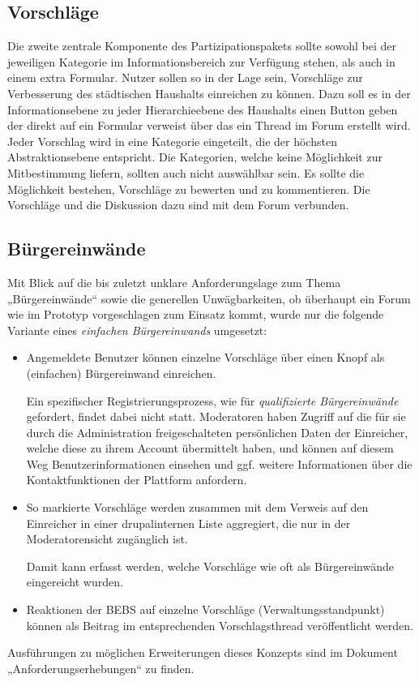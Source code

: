 \documentclass[a4paper,11pt,twoside]{article}
\begin{document}
\subsection{Vorschläge}
Die zweite zentrale Komponente des Partizipationspakets sollte sowohl bei der
jeweiligen Kategorie im Informationsbereich zur Verfügung stehen, als auch in
einem extra Formular. Nutzer sollen so in der Lage sein, Vorschläge zur
Verbesserung des städtischen Haushalts einreichen zu können. Dazu soll es in
der Informationsebene zu jeder Hierarchieebene des Haushalts einen Button geben
der direkt auf ein Formular verweist über das ein Thread im Forum erstellt
wird. Jeder Vorschlag wird in eine Kategorie eingeteilt, die der höchsten
Abstraktionsebene entspricht. Die Kategorien, welche keine Möglichkeit zur
Mitbestimmung liefern, sollten auch nicht auswählbar sein. Es sollte die
Möglichkeit bestehen, Vorschläge zu bewerten und zu kommentieren. Die
Vorschläge und die Diskussion dazu sind mit dem Forum verbunden.

\subsection{Bürgereinwände}

Mit Blick auf die bis zuletzt unklare Anforderungslage zum Thema
„Bürgereinwände“ sowie die generellen Unwägbarkeiten, ob überhaupt ein Forum
wie im Prototyp vorgeschlagen zum Einsatz kommt, wurde nur die folgende
Variante eines \emph{einfachen Bürgereinwands} umgesetzt:
\begin{itemize}
\item Angemeldete Benutzer können einzelne Vorschläge über einen Knopf als
  (einfachen) Bürgereinwand einreichen. 
  
  Ein spezifischer Registrierungsprozess, wie für \emph{qualifizierte
    Bürgereinwände} gefordert, findet dabei nicht statt. Moderatoren haben
  Zugriff auf die für sie durch die Administration freigeschalteten
  persönlichen Daten der Einreicher, welche diese zu ihrem Account übermittelt
  haben, und können auf diesem Weg Benutzerinformationen einsehen und
  ggf. weitere Informationen über die Kontaktfunktionen der Plattform
  anfordern. 

\item So markierte Vorschläge werden zusammen mit dem Verweis auf den
  Einreicher in einer drupalinternen Liste aggregiert, die nur in der
  Moderatorensicht zugänglich ist.

  Damit kann erfasst werden, welche Vorschläge wie oft als Bürgereinwände
  eingereicht wurden.

\item Reaktionen der BEBS auf einzelne Vorschläge (Verwaltungsstandpunkt)
  können als Beitrag im entsprechenden Vorschlagsthread veröffentlicht werden.
\end{itemize}
Ausführungen zu möglichen Erweiterungen dieses Konzepts sind im Dokument
„Anforderungserhebungen“ zu finden.
\end{document}
